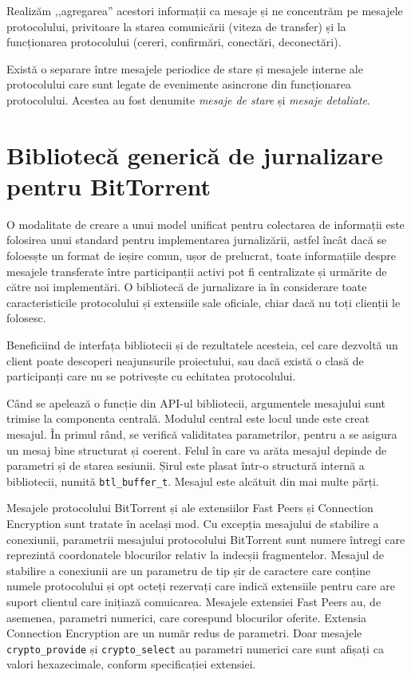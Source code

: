 Realizăm ,,agregarea'' acestori informații ca mesaje și ne concentrăm pe
mesajele protocolului, privitoare la starea comunicării (viteza de transfer)
și la funcționarea protocolului (cereri, confirmări, conectări, deconectări).

Există o separare între mesajele periodice de stare și mesajele interne ale
protocolului care sunt legate de evenimente asincrone din funcționarea
protocolului. Acestea au fost denumite \textit{mesaje de stare} și
\textit{mesaje detaliate}.

\section{Bibliotecă generică de jurnalizare pentru BitTorrent}
\label{sec:proto-measure:log-library}

O modalitate de creare a unui model unificat pentru colectarea de informații
este folosirea unui standard pentru implementarea jurnalizării, astfel încât
dacă se foloesște un format de ieșire comun, ușor de prelucrat, toate
informațiile despre mesajele transferate între participanții activi pot fi
centralizate și urmărite de către noi implementări. O bibliotecă de jurnalizare
ia în considerare toate caracteristicile protocolului și extensiile sale
oficiale, chiar dacă nu toți clienții le folosesc.

Beneficiind de interfața bibliotecii și de rezultatele acesteia, cel care
dezvoltă un client poate descoperi neajunsurile proiectului, sau dacă există
o clasă de participanți care nu se potrivește cu echitatea protocolului.

Când se apelează o funcție din API-ul bibliotecii, argumentele mesajului sunt
trimise la componenta centrală. Modulul central este locul unde
este creat mesajul. În primul rând, se verifică validitatea parametrilor, pentru
a se asigura un mesaj bine structurat și coerent. Felul în care va arăta
mesajul depinde de parametri și de starea sesiunii. Șirul este plasat
într-o structură internă a bibliotecii, numită \texttt{btl\_buffer\_t}.
Mesajul este alcătuit din mai multe părți.

Mesajele protocolului BitTorrent și ale extensiilor Fast Peers și Connection
Encryption sunt tratate în același mod. Cu excepția mesajului de stabilire
a conexiunii, parametrii mesajului protocolului BitTorrent sunt numere întregi
care reprezintă coordonatele blocurilor relativ la indecșii fragmentelor.
Mesajul de stabilire a conexiunii are un parametru de tip șir de caractere
care conține numele protocolului și opt octeți rezervați care indică
extensiile pentru care are suport clientul care inițiază comuicarea. Mesajele
extensiei Fast Peers au, de asemenea, parametri numerici, care corespund
blocurilor oferite. Extensia Connection Encryption are un număr redus de
parametri. Doar mesajele \texttt{crypto\_provide} și \texttt{crypto\_select}
au parametri numerici care sunt afișați ca valori hexazecimale, conform
specificației extensiei.

